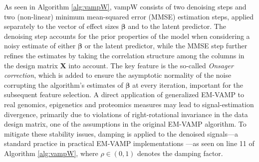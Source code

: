 As seen in Algorithm \ref{alg:vampW}, vampW consists of two denoising steps and two (non-linear) minimum mean-squared error (MMSE) estimation steps, applied separately to the vector of effect sizes $\bm{\beta}$ and to the latent predictor. The denoising step accounts for the prior properties of the model when considering a noisy estimate of either  $\bm{\beta}$ or the latent predictor, while the MMSE step further refines the estimates by taking the correlation structure among the columns in the design matrix $\bm{X}$ into account. The key feature is the so-called \textit{Onsager correction}, which is added to ensure the asymptotic normality of the noise corrupting the algorithm's estimates of $\bm{\beta}$ at every iteration, important for the subsequent feature selection. A direct application of generalized EM-VAMP to real genomics, epigenetics and proteomics measures may lead to signal-estimation divergence, primarily due to violations of right-rotational invariance in the data design matrix, one of the assumptions in the original EM-VAMP algorithm. To mitigate these stability issues, damping is applied to the denoised signals---a standard practice in practical EM-VAMP implementations \cite{VAMP_MRI,sarkar2021mri}---as seen on line 11 of Algorithm \ref{alg:vampW}, where $\rho \in ( 0, 1 )$ denotes the damping factor.






